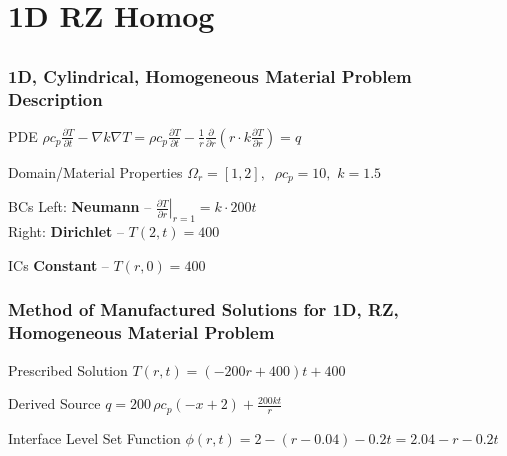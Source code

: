 \documentclass[]{beamer}
\begin{document}
\section{1D RZ Homog}
\subsection{}
\begin{frame}[t]\frametitle{1D, Cylindrical, Homogeneous Material Problem Description}
  \begin{block}{PDE}
    $\rho c_p\frac{\partial T}{\partial t} - \nabla k \nabla T = \rho c_p\frac{\partial T}{\partial t} - \frac{1}{r} \frac{\partial}{\partial r}\left(r\cdot k \frac{\partial T}{\partial r} \right) = q$
  \end{block}
  
  \begin{block}{Domain/Material Properties}
  	$\Omega_r = [1,2], \,\,\ \rho c_p = 10, \,\, k = 1.5$
  \end{block}
  
  \begin{block}{BCs}
    Left:  \textbf{Neumann} -- $\left. \frac{\partial T}{\partial r}\right|_{r=1} = k \cdot 200t$ \\
    Right: \textbf{Dirichlet} -- $T(2,t) = 400$
  \end{block}
  
  \begin{block}{ICs}
    \textbf{Constant} -- $T(r,0) = 400$
  \end{block}
\end{frame}

\begin{frame}[t]\frametitle{Method of Manufactured Solutions for 1D, RZ, Homogeneous Material Problem}
  \begin{block}{Prescribed Solution}
    $T(r,t) = (-200r+400)t + 400$
  \end{block}
  
  \begin{block}{Derived Source}
  $q = 200\,\rho c_p \left(-x+2\right) + \frac{200kt}{r}$
  \end{block}
  
  \begin{block}{Interface Level Set Function}
    $\phi(r,t) = 2 - (r - 0.04) - 0.2t = 2.04 - r - 0.2t$
  \end{block}
\end{frame}
\end{document}
